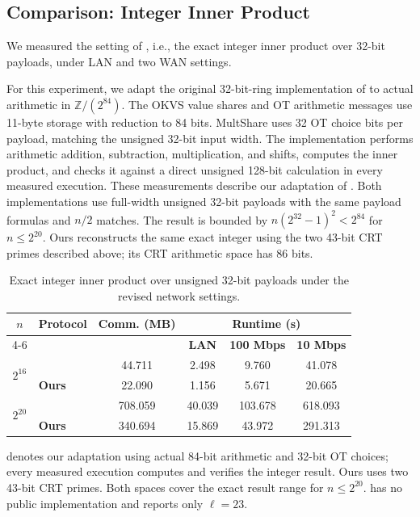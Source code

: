 \subsection{Comparison: Integer Inner Product}
\label{sec:integer-ip-exp}
We measured the setting of , i.e., the exact integer
inner product over 32-bit payloads, under LAN and two WAN settings.
 
For this experiment, we adapt the original 32-bit-ring implementation
of \cite{KLS26} to actual arithmetic in $\mathbb{Z}/(2^{84})$.
The OKVS value shares and OT arithmetic messages use 11-byte storage
with reduction to 84 bits. MultShare uses 32 OT choice bits per payload,
matching the unsigned 32-bit input width. The implementation performs
arithmetic addition, subtraction, multiplication, and shifts, computes
the inner product, and checks it against a direct unsigned 128-bit
calculation in every measured execution. These measurements describe
our adaptation of \cite{KLS26}. Both implementations use full-width
unsigned 32-bit payloads with the same payload formulas and $n/2$
matches. The result is bounded by $n(2^{32}-1)^2<2^{84}$ for
$n\leq 2^{20}$. Ours reconstructs the same exact integer using the two
43-bit CRT primes described above; its CRT arithmetic space has 86 bits.

\begin{table}[!htbp]
\centering
\caption{Exact integer inner product over unsigned 32-bit payloads under the revised network settings.}
\label{tab:pjc-long}
\setlength{\tabcolsep}{2.2pt}
\renewcommand{\arraystretch}{1.05}
\footnotesize
\begin{tabular}{c l c c c c}
\toprule
\multirow{2}{*}{$n$} & \multirow{2}{*}{\textbf{Protocol}} & \multirow{2}{*}{\textbf{Comm. (MB)}} & \multicolumn{3}{c}{\textbf{Runtime (s)}} \\
\cmidrule(lr){4-6}
& & & \textbf{LAN} & \textbf{100 Mbps} & \textbf{10 Mbps} \\
\midrule
\multirow[t]{2}{*}{$2^{16}$}
& \cite{KLS26} & 44.711 & 2.498 & 9.760 & 41.078 \\
& \textbf{Ours} & 22.090 & 1.156 & 5.671 & 20.665 \\
\midrule
\multirow[t]{2}{*}{$2^{20}$}
& \cite{KLS26} & 708.059 & 40.039 & 103.678 & 618.093 \\
& \textbf{Ours} & 340.694 & 15.869 & 43.972 & 291.313 \\
\bottomrule
\end{tabular}
\vspace{2pt}
\begin{minipage}{0.95\linewidth}
\footnotesize
\cite{KLS26} denotes our adaptation using actual 84-bit arithmetic
and 32-bit OT choices; every measured execution computes and verifies
the integer result. Ours uses two 43-bit CRT primes. Both spaces cover
the exact result range for $n\leq 2^{20}$.
\cite{CHI+23} has no public implementation and reports only $\ell=23$.
\end{minipage}
\end{table}

